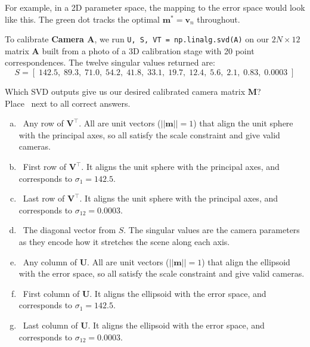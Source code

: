 \documentclass{csci1430}
\begin{document}
\pagebreak

For example, in a 2D parameter space, the mapping to the error space would look like this. The green dot tracks the optimal $\mathbf{m}^* = \mathbf{v}_n$ throughout.


\pagebreak

\begin{subquestion}[points=3,drawbox=false]
To calibrate \textbf{Camera A}, we run \texttt{U, S, VT = np.linalg.svd(A)} on our $2N \times 12$ matrix $\mathbf{A}$ built from a photo of a 3D calibration stage with 20 point correspondences. The twelve singular values returned are:
\[
S = [\;142.5,\; 89.3,\; 71.0,\; 54.2,\; 41.8,\; 33.1,\; 19.7,\; 12.4,\; 5.6,\; 2.1,\; 0.83,\; 0.0003\;]
\]

\begin{orangebox}
Which SVD outputs give us our desired calibrated camera matrix $\mathbf{M}$? \\
Place \filled~next to all correct answers.
\end{orangebox}
\end{subquestion}

\begin{answer}[height=17]
\begin{enumerate}[(a),leftmargin=12pt]
\item \cbox~Any row of $\mathbf{V^\top}$. All are unit vectors ($||\mathbf{m}||=1$) that align the unit sphere with the principal axes, so all satisfy the scale constraint and give valid cameras.
\item \cbox~First row of $\mathbf{V^\top}$. It aligns the unit sphere with the principal axes, and corresponds to $\sigma_{1} = 142.5$.
\item \cbox~Last row of $\mathbf{V^\top}$. It aligns the unit sphere with the principal axes, and corresponds to $\sigma_{12} = 0.0003$.
\item \cbox~The diagonal vector from $S$. The singular values are the camera parameters as they encode how it stretches the scene along each axis.
\item \cbox~Any column of $\mathbf{U}$. All are unit vectors ($||\mathbf{m}||=1$) that align the ellipsoid with the error space, so all satisfy the scale constraint and give valid cameras.
\item \cbox~First column of $\mathbf{U}$. It aligns the ellipsoid with the error space, and corresponds to $\sigma_{1} = 142.5$.
\item \cbox~Last column of $\mathbf{U}$. It aligns the ellipsoid with the error space, and corresponds to $\sigma_{12} = 0.0003$.
\end{enumerate}
\end{answer}
\end{document}
